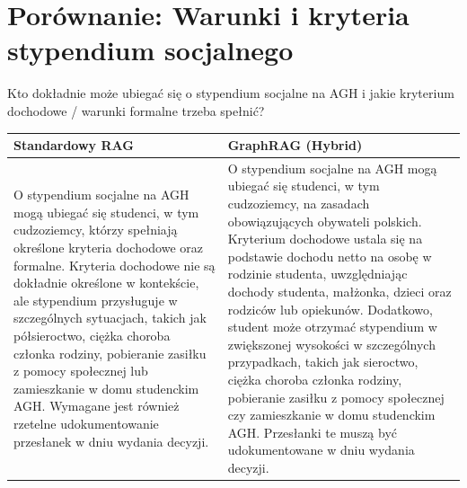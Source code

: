 \newpage

\section*{Porównanie: Warunki i kryteria stypendium socjalnego}

\begin{tcolorbox}[colback=blue!5!white,colframe=blue!75!black,title=Pytanie użytkownika]
    Kto dokładnie może ubiegać się o stypendium socjalne na AGH i jakie kryterium dochodowe / warunki formalne trzeba spełnić?
\end{tcolorbox}

\noindent
\begin{tabularx}{\textwidth}{@{} XX @{}}
    \toprule
    \textbf{Standardowy RAG} & \textbf{GraphRAG (Hybrid)} \\
    \midrule
    \small 
    O stypendium socjalne na AGH mogą ubiegać się studenci, w tym cudzoziemcy, którzy spełniają określone kryteria dochodowe oraz formalne. Kryteria dochodowe nie są dokładnie określone w kontekście, ale stypendium przysługuje w szczególnych sytuacjach, takich jak półsieroctwo, ciężka choroba członka rodziny, pobieranie zasiłku z pomocy społecznej lub zamieszkanie w domu studenckim AGH. Wymagane jest również rzetelne udokumentowanie przesłanek w dniu wydania decyzji.
    & 
    \small 
    O stypendium socjalne na AGH mogą ubiegać się studenci, w tym cudzoziemcy, na zasadach obowiązujących obywateli polskich. Kryterium dochodowe ustala się na podstawie dochodu netto na osobę w rodzinie studenta, uwzględniając dochody studenta, małżonka, dzieci oraz rodziców lub opiekunów. Dodatkowo, student może otrzymać stypendium w zwiększonej wysokości w szczególnych przypadkach, takich jak sieroctwo, ciężka choroba członka rodziny, pobieranie zasiłku z pomocy społecznej czy zamieszkanie w domu studenckim AGH. Przesłanki te muszą być udokumentowane w dniu wydania decyzji. \\
    \bottomrule
\end{tabularx}

